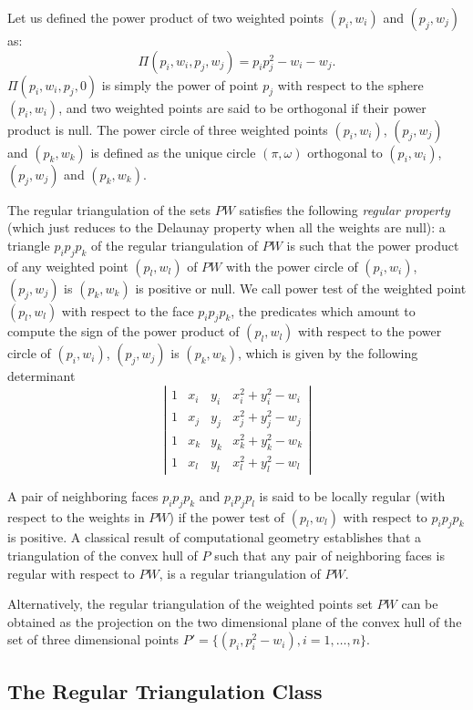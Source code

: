 Let us defined the power product of two weighted points
$(p_i, w_i)$ and $(p_j, w_j)$ as:
\[\Pi(p_i, w_i,p_j, w_j) = p_ip_j ^2 - w_i  - w_j  .\]
$\Pi(p_i, w_i,p_j, 0)$ is simply the power of point $p_j$
with respect to the sphere $(p_i, w_i)$, and two weighted points 
are said to be orthogonal if their power product is null.
The power circle of three weighted points
 $(p_i, w_i)$, $(p_j, w_j)$
and $(p_k, w_k)$ is defined as the unique circle
$(\pi, \omega)$  orthogonal to
 $(p_i, w_i)$, $(p_j, w_j)$
and $(p_k, w_k)$.

The regular triangulation of the sets ${  PW}$
satisfies the following {\em regular property} (which just reduces to the 
Delaunay property when all the weights are null):
a triangle $p_ip_jp_k$ of the regular triangulation
of ${  PW}$ is such that the power product of any weighted point
 $(p_l, w_l)$ of ${  PW}$ with the power circle of
 $(p_i, w_i)$, $(p_j, w_j)$ is $(p_k, w_k)$ is positive or null.
We call  power test of the weighted point $(p_l, w_l)$ with respect
to the face  $p_ip_jp_k$, the predicates which amount to compute
the sign of 
the power product of $(p_l, w_l)$ with respect to
the power circle of
 $(p_i, w_i)$, $(p_j, w_j)$ is $(p_k, w_k)$,
which is given by the following
determinant
\[\left| \begin{array}{cccc}
1  &  x_i  &  y_i  &  x_i ^2 + y_i ^2 - w_i  \\
1  &  x_j  &  y_j  &  x_j ^2 + y_j ^2 - w_j  \\
1  &  x_k  &  y_k  &  x_k ^2 + y_k ^2 - w_k  \\
1  &  x_l  &  y_l  &  x_l ^2 + y_l ^2 - w_l
\end{array}
\right|
\]

A pair of neighboring faces $p_ip_jp_k$
and $p_ip_jp_l$ is said to be locally regular
(with respect to  the weights in ${  PW}$)
if the power test of $(p_l,w_l)$ with respect to
$p_ip_jp_k$ is positive.
A classical  result of computational geometry
establishes that a triangulation of the convex hull of ${  P}$
such that any pair of neighboring faces is regular with respect
to ${  PW}$, is a
 regular triangulation of ${  PW}$.

Alternatively, the regular triangulation
of the weighted points set ${  PW}$
can be obtained as the projection
on the two dimensional plane of the convex hull of the set of three
dimensional points 
${  P'}= \{ (p_i,p_i ^2 - w_i ), i = 1, \ldots , n \}$.

\subsection{ The Regular Triangulation  Class}


